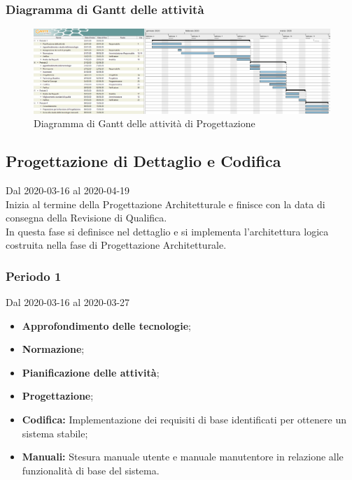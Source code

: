 \newpage
\begin{landscape}
	\subsubsection{Diagramma di Gantt delle attività}
	\pagestyle{empty}
	\begin{figure}[h]
		\caption{Diagramma di Gantt delle attività di Progettazione}
		\begin{center}	
			\includegraphics[scale=1.6]{Sezioni/DiagrammiGantt/ProgettazioneArchitetturale.png}
		\end{center}
		
	\end{figure}
\end{landscape}

\subsection{Progettazione di Dettaglio e Codifica}
Dal 2020-03-16 al 2020-04-19\\
Inizia al termine della Progettazione Architetturale e finisce con la data di consegna della Revisione di Qualifica.\\
In questa fase si definisce nel dettaglio e si implementa l'architettura logica costruita nella fase di Progettazione Architetturale.\\


\subsubsection{Periodo 1} 
Dal 2020-03-16 al 2020-03-27\\
\begin{itemize}
	\item \textbf{Approfondimento delle tecnologie};
	\item \textbf{Normazione};
	\item \textbf{Pianificazione delle attività};
	\item \textbf{Progettazione};
	\item \textbf{Codifica:} Implementazione dei requisiti di base identificati per ottenere un sistema stabile;
	\item \textbf{Manuali:} Stesura manuale utente e manuale manutentore in relazione alle funzionalità di base del sistema.
\end{itemize}
